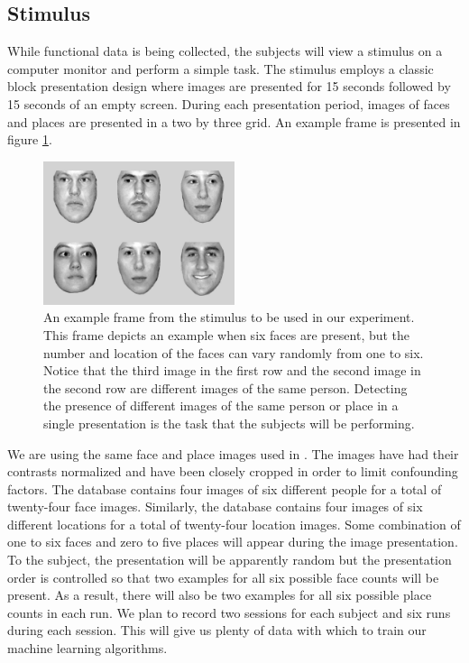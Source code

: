 \documentclass[12pt]{article}
\begin{document}
\subsection{Stimulus}
While functional data is being collected, the subjects will view a stimulus on a computer monitor and perform a simple task.
The stimulus employs a classic block presentation design where images are presented for 15 seconds followed by 15 seconds of an empty screen.
During each presentation period, images of faces and places are presented in a two by three grid.
An example frame is presented in figure \ref{fig:stimulus-frame}.
\begin{figure}
\centering
\includegraphics[width=0.5\textwidth]{figures/stimulus-frame}
\caption{An example frame from the stimulus to be used in our experiment.
This frame depicts an example when six faces are present, but the number and location of the faces can vary randomly from one to six.
Notice that the third image in the first row and the second image in the second row are different images of the same person.
Detecting the presence of different images of the same person or place in a single presentation is the task that the subjects will be performing.}
\label{fig:stimulus-frame}
\end{figure}
We are using the same face and place images used in \cite{Haxby2001}.
The images have had their contrasts normalized and have been closely cropped in order to limit confounding factors.
The database contains four images of six different people for a total of twenty-four face images.
Similarly, the database contains four images of six different locations for a total of twenty-four location images.
Some combination of one to six faces and zero to five places will appear during the image presentation.
To the subject, the presentation will be apparently random but the presentation order is controlled so that two examples for all six possible face counts will be present.
As a result, there will also be two examples for all six possible place counts in each run.
We plan to record two sessions for each subject and six runs during each session.
This will give us plenty of data with which to train our machine learning algorithms.
\end{document}
